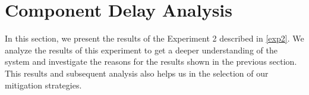 



\section{Component Delay Analysis}
In this section, we present the results of the Experiment 2 described in \ref{exp2}.
We analyze the results of this experiment to get a deeper understanding of the system and investigate the reasons for the results shown in the previous section.
This results and subsequent analysis also helps us in the selection of our mitigation strategies.\\

